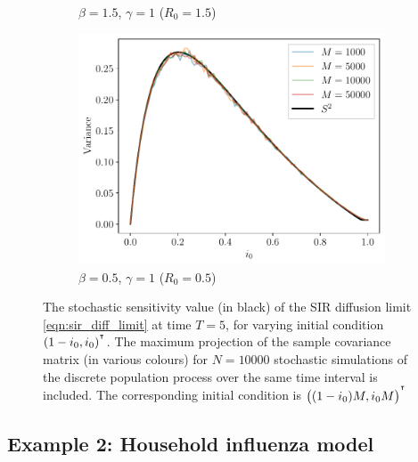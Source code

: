\begin{figure}
\begin{center}
\begin{subfigure}{0.49\textwidth}
			\caption{\(\beta = 1.5\), \(\gamma = 1\) (\(R_0 = 1.5\))}
		\end{subfigure}\begin{subfigure}{0.49\textwidth}
			\includegraphics[width=\textwidth]{chp06_applications/figures/sir/sir_s2_0.5_1.0.pdf}
			\caption{\(\beta = 0.5\), \(\gamma = 1\) (\(R_0 = 0.5\))}
		\end{subfigure}
		\caption{The stochastic sensitivity value (in black) of the SIR diffusion limit \cref{eqn:sir_diff_limit} at time \(T = 5\), for varying initial condition \((1 - i_0, i_0)^{^{\intercal}}\).
			The maximum projection of the sample covariance matrix (in various colours) for \(N = 10000\) stochastic simulations of the discrete population process over the same time interval is included.
			The corresponding initial condition is \(\left((1 - i_0)M, i_0 M\right)^{^{\intercal}}\)}
		\label{fig:}
	\end{center}
\end{figure}






\subsection{Example 2: Household influenza model}\label{sec:epi_5d}


